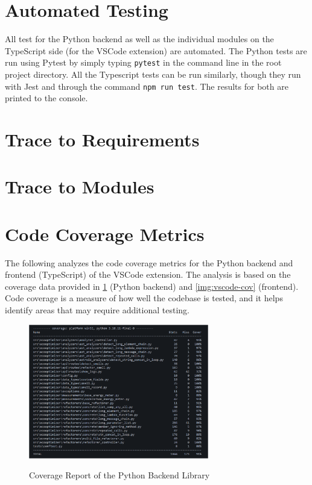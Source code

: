 \documentclass[12pt, titlepage]{article}
\begin{document}

\section{Automated Testing}

All test for the Python backend as well as the individual modules on the TypeScript side (for the VSCode extension) are automated. The Python tests are run using Pytest by simply typing \texttt{pytest} in the command line in the root project directory. All the Typescript tests can be run similarly, though they run with Jest and through the command \texttt{npm run test}. The results for both are printed to the console.
		
\section{Trace to Requirements}
		
\section{Trace to Modules}		

\section{Code Coverage Metrics}

The following analyzes the code coverage metrics for the Python backend and frontend (TypeScript) of the VSCode extension. The analysis is based on the coverage data provided in \ref{img:python-cov} (Python backend) and \ref{img:vscode-cov} (frontend). Code coverage is a measure of how well the codebase is tested, and it helps identify areas that may require additional testing.

\begin{figure}[H]
  \centering
  \includegraphics[width=0.7\textwidth]{../Images/python-coverage.png}
  \label{img:python-cov}
  \caption{Coverage Report of the Python Backend Library}
\end{figure}
\end{document}
